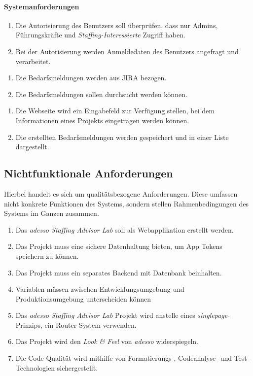 \paragraph{Systemanforderungen}
\begin{enumerate}[label=1.\arabic*]
	\item Die Autorisierung des Benutzers soll überprüfen, dass nur Admins, Führungskräfte und \emph{Staffing-Interessierte} Zugriff haben.
	\item Bei der Autorisierung werden Anmeldedaten des Benutzers angefragt und verarbeitet.
\end{enumerate}
\begin{enumerate}[label=2.\arabic*]
	\item Die Bedarfsmeldungen werden aus JIRA bezogen.
	\item Die Bedarfsmeldungen sollen durchsucht werden können.
\end{enumerate}
\begin{enumerate}[label=3.\arabic*]
	\item Die Webseite wird ein Eingabefeld zur Verfügung stellen, bei dem Informationen eines Projekts eingetragen werden können.
	\item Die erstellten Bedarfsmeldungen werden gespeichert und in einer Liste dargestellt.
\end{enumerate}
\subsection{Nichtfunktionale Anforderungen}
Hierbei handelt es sich um qualitätsbezogene Anforderungen. Diese umfassen nicht konkrete Funktionen des Systems, sondern stellen Rahmenbedingungen des Systems im Ganzen zusammen.
\begin{enumerate}
	\item Das \emph{adesso Staffing Advisor Lab} soll als Webapplikation erstellt werden.
	\item Das Projekt muss eine sichere Datenhaltung bieten, um App Tokens speichern zu können.
	\item Das Projekt muss ein separates Backend mit Datenbank beinhalten.
	\item Variablen müssen zwischen Entwicklungsumgebung und Produktionsumgebung unterscheiden können
	\item Das \emph{adesso Staffing Advisor Lab} Projekt wird anstelle eines \emph{singlepage}-Prinzips, ein Router-System verwenden.
	\item Das Projekt wird den \emph{Look \& Feel} von \emph{adesso} widerspiegeln.
	\item Die Code-Qualität wird mithilfe von Formatierungs-, Codeanalyse- und Test-Technologien sichergestellt.
\end{enumerate}
\newpage
